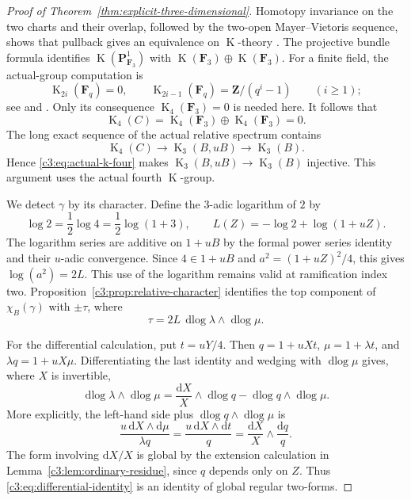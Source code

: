 \documentclass[11pt,a4paper]{amsart}
\numberwithin{equation}{section}
\theoremstyle{definition}
\theoremstyle{remark}
\newcommand{\CthreeZ}{\mathbf{Z}}
\newcommand{\CthreeF}{\mathbf{F}}
\newcommand{\CthreePP}{\mathbf{P}}
\newcommand{\Cthreedd}{\mathrm{d}}
\DeclareMathOperator{\CthreeK}{K}
\DeclareMathOperator{\Cthreedlog}{dlog}
\begin{document}
\begin{proof}[Proof of Theorem~\ref{thm:explicit-three-dimensional}]
Homotopy invariance on the two charts and their overlap, followed by
the two-open Mayer--Vietoris sequence, shows that pullback gives an
equivalence on $\CthreeK$-theory
\cite[\S7, Remark~3.5 and Proposition~4.1]{Quillen}.
The projective bundle formula
\cite[\S8, Theorem~2.1]{Quillen} identifies
$\CthreeK(\CthreePP^1_{\CthreeF_3})$ with $\CthreeK(\CthreeF_3)\oplus\CthreeK(\CthreeF_3)$.
For a finite field, the actual-group computation is
\[
 \CthreeK_{2i}(\CthreeF_q)=0,\qquad
 \CthreeK_{2i-1}(\CthreeF_q)=\CthreeZ/(q^i-1)
 \qquad(i\geq1);
\]
see \cite{QuillenFinite} and
\cite[IV, Theorem~1.12 and Corollary~1.13]{Weibel}.
Only its consequence $\CthreeK_4(\CthreeF_3)=0$ is needed here.
It follows that
\begin{equation}\label{c3:eq:actual-k-four}
 \CthreeK_4(C)=\CthreeK_4(\CthreeF_3)\oplus\CthreeK_4(\CthreeF_3)=0.
\end{equation}
The long exact sequence of the actual relative spectrum contains
\[
 \CthreeK_4(C)\longrightarrow\CthreeK_3(B,uB)\longrightarrow\CthreeK_3(B).
\]
Hence \eqref{c3:eq:actual-k-four} makes
$\CthreeK_3(B,uB)\to\CthreeK_3(B)$ injective.
This argument uses the actual fourth $\CthreeK$-group.

We detect $\gamma$ by its character.
Define the $3$-adic logarithm of $2$ by
\[
 \log2=\frac12\log4=\frac12\log(1+3),
 \qquad
 L(Z)=-\log2+\log(1+uZ).
\]
The logarithm series are additive on $1+uB$ by the formal power
series identity and their $u$-adic convergence.
Since $4\in1+uB$ and
$a^2=(1+uZ)^2/4$, this gives
$\log(a^2)=2L$.
This use of the logarithm remains valid at ramification index two.
Proposition~\ref{c3:prop:relative-character} identifies the top
component of $\chi_B(\gamma)$ with $\pm\tau$, where
\begin{equation}\label{c3:eq:character-form}
 \tau=2L\,\Cthreedlog\lambda\wedge\Cthreedlog\mu.
\end{equation}

For the differential calculation, put $t=uY/4$.
Then $q=1+uXt$, $\mu=1+\lambda t$, and
$\lambda q=1+uX\mu$.
Differentiating the last identity and wedging with $\Cthreedlog\mu$ gives,
where $X$ is invertible,
\begin{equation}\label{c3:eq:differential-identity}
 \Cthreedlog\lambda\wedge\Cthreedlog\mu
   =\frac{\Cthreedd X}{X}\wedge\Cthreedlog q
      -\Cthreedlog q\wedge\Cthreedlog\mu.
\end{equation}
More explicitly, the left-hand side plus
$\Cthreedlog q\wedge\Cthreedlog\mu$ is
\[
 \frac{u\,\Cthreedd X\wedge\Cthreedd\mu}{\lambda q}
   =\frac{u\,\Cthreedd X\wedge\Cthreedd t}{q}
   =\frac{\Cthreedd X}{X}\wedge\frac{\Cthreedd q}{q}.
\]
The form involving $\Cthreedd X/X$ is global by the extension calculation
in Lemma~\ref{c3:lem:ordinary-residue}, since $q$ depends only on $Z$.
Thus \eqref{c3:eq:differential-identity} is an identity of global regular
two-forms.


\end{proof}
\end{document}

